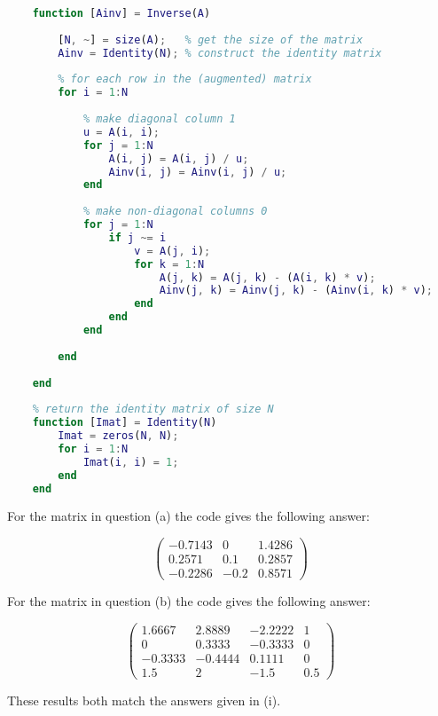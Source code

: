 \documentclass[12pt]{article}
\begin{document}
\begin{lstlisting}[language=Matlab]
    % calculate the inverse of a matrix A
    function [Ainv] = Inverse(A)
        
        [N, ~] = size(A);   % get the size of the matrix
        Ainv = Identity(N); % construct the identity matrix
        
        % for each row in the (augmented) matrix
        for i = 1:N
            
            % make diagonal column 1
            u = A(i, i);
            for j = 1:N
                A(i, j) = A(i, j) / u;
                Ainv(i, j) = Ainv(i, j) / u;
            end
            
            % make non-diagonal columns 0
            for j = 1:N
                if j ~= i
                    v = A(j, i);
                    for k = 1:N
                        A(j, k) = A(j, k) - (A(i, k) * v);
                        Ainv(j, k) = Ainv(j, k) - (Ainv(i, k) * v);
                    end
                end
            end
            
        end
        
    end
    
    % return the identity matrix of size N
    function [Imat] = Identity(N)
        Imat = zeros(N, N);
        for i = 1:N
            Imat(i, i) = 1;
        end
    end
\end{lstlisting}

\noindent For the matrix in question (a) the code gives the following answer:

$$
\begin{pmatrix}
    -0.7143 & 0 & 1.4286 \\
    0.2571 & 0.1 & 0.2857 \\
    -0.2286 & -0.2 & 0.8571
\end{pmatrix}
$$

\noindent For the matrix in question (b) the code gives the following answer:

$$
\begin{pmatrix}
    1.6667 & 2.8889 & -2.2222 & 1 \\
    0 & 0.3333 & -0.3333 & 0 \\
    -0.3333 & -0.4444 & 0.1111 & 0 \\
    1.5 & 2 & -1.5 & 0.5
\end{pmatrix}
$$

\noindent These results both match the answers given in (i).
\end{document}
